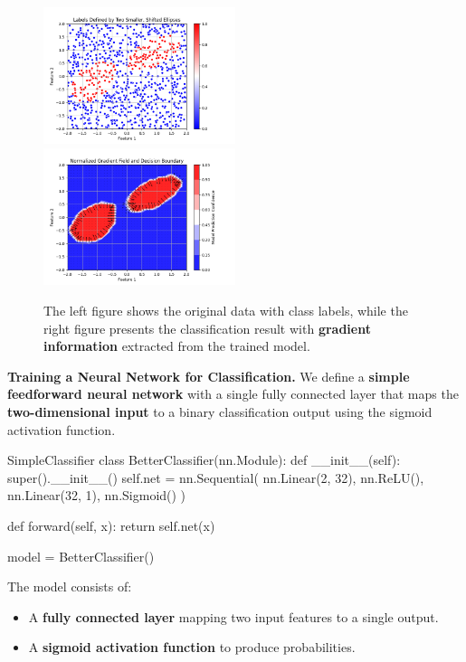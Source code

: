 \begin{figure}
\includegraphics[width=0.5\textwidth]{images/points_labled.png}
\includegraphics[width=0.5\textwidth]{images/points_classified_with_gradients.png}
\caption{The left figure shows the original data with class labels, while the right figure presents the classification result with \textbf{gradient information} extracted from the trained model.}
\end{figure}

{\bf Training a Neural Network for Classification.} We define a \textbf{simple feedforward neural network} with a single fully connected layer that maps the \textbf{two-dimensional input} to a binary classification output using the sigmoid activation function.

\begin{codeonly}{SimpleClassifier}
class BetterClassifier(nn.Module):
    def __init__(self):
        super().__init__()
        self.net = nn.Sequential(
            nn.Linear(2, 32),
            nn.ReLU(),
            nn.Linear(32, 1),
            nn.Sigmoid()
        )
    
    def forward(self, x):
        return self.net(x)

model = BetterClassifier()
\end{codeonly}

The model consists of:
\begin{itemize}
    \item A \textbf{fully connected layer} mapping two input features to a single output.
    \item A \textbf{sigmoid activation function} to produce probabilities.
\end{itemize}

